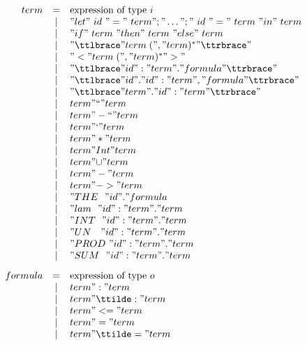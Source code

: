 \begin{figure} 
\dquotes
\[\begin{array}{rcl}
    term & = & \hbox{expression of type~$i$} \\
         & | & "let"~id~"="~term";"\dots";"~id~"="~term~"in"~term \\
         & | & "if"~term~"then"~term~"else"~term \\
         & | & "{\ttlbrace} " term\; ("," term)^* " {\ttrbrace}" \\
         & | & "< "  term\; ("," term)^* " >"  \\
         & | & "{\ttlbrace} " id ":" term " . " formula " {\ttrbrace}" \\
         & | & "{\ttlbrace} " id " . " id ":" term ", " formula " {\ttrbrace}" \\
         & | & "{\ttlbrace} " term " . " id ":" term " {\ttrbrace}" \\
         & | & term " `` " term \\
         & | & term " -`` " term \\
         & | & term " ` " term \\
         & | & term " * " term \\
         & | & term " Int " term \\
         & | & term " \isasymunion " term \\
         & | & term " - " term \\
         & | & term " -> " term \\
         & | & "THE~~"  id  " . " formula\\
         & | & "lam~~"  id ":" term " . " term \\
         & | & "INT~~"  id ":" term " . " term \\
         & | & "UN~~~"  id ":" term " . " term \\
         & | & "PROD~"  id ":" term " . " term \\
         & | & "SUM~~"  id ":" term " . " term \\[2ex]
 formula & = & \hbox{expression of type~$o$} \\
         & | & term " : " term \\
         & | & term " \ttilde: " term \\
         & | & term " <= " term \\
         & | & term " = " term \\
         & | & term " \ttilde= " term \\

\end{array}\]
\end{figure}
